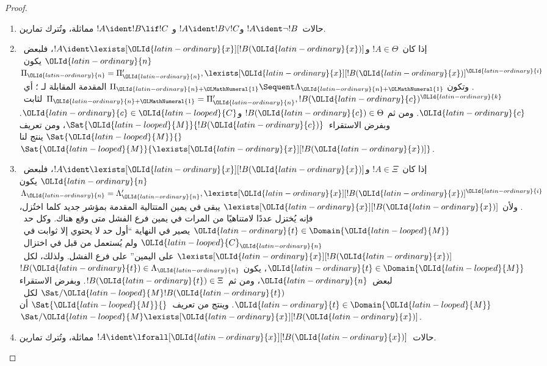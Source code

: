 \documentclass[../../../include/open-logic-section]{subfiles}
\begin{document}
\begin{proof}
\begin{enumerate}
  \item حالات~$!A\ident\lnot !B$ و$!A\ident !B\lor !C$ و
  $!A\ident !B\lif !C$ مماثلة، وتُترك تمارين.

  \item إذا كان~$!A\in\Theta$ و$!A\ident\lexists[{\OLId{latin-ordinary}{x}}][!B({\OLId{latin-ordinary}{x}})]$، فلبعض~${\OLId{latin-ordinary}{n}}$
  يكون~$\Pi_{\OLId{latin-ordinary}{n}}=\Pi_{\OLId{latin-ordinary}{n}}',\lexists[{\OLId{latin-ordinary}{x}}][!B({\OLId{latin-ordinary}{x}})]^{\OLId{latin-ordinary}{i}}$. وتكون
  $\Pi_{{\OLId{latin-ordinary}{n}}+{\OLMathNumeral{1}}}\Sequent\Lambda_{{\OLId{latin-ordinary}{n}}+{\OLMathNumeral{1}}}$ المقدمة المقابلة لـ
  \LeftR{\lexists}؛ أي~$\Pi_{{\OLId{latin-ordinary}{n}}+{\OLMathNumeral{1}}}=\Pi_{\OLId{latin-ordinary}{n}}',!B({\OLId{latin-ordinary}{c}})^{\OLId{latin-ordinary}{k}}$ لثابت~${\OLId{latin-ordinary}{c}}$. ومن ثم
  $!B({\OLId{latin-ordinary}{c}})\in\Theta$ و${\OLId{latin-ordinary}{c}}\in {\OLId{latin-looped}{C}}$. وبفرض الاستقراء~$\Sat{{\OLId{latin-looped}{M}}}{!B({\OLId{latin-ordinary}{c}})}$، ومن تعريف
  $\Sat{{\OLId{latin-looped}{M}}}{}$ ينتج لنا~$\Sat{{\OLId{latin-looped}{M}}}{\lexists[{\OLId{latin-ordinary}{x}}][!B({\OLId{latin-ordinary}{x}})]}$.

  \item إذا كان~$!A\in\Xi$ و$!A\ident\lexists[{\OLId{latin-ordinary}{x}}][!B({\OLId{latin-ordinary}{x}})]$، فلبعض~${\OLId{latin-ordinary}{n}}$ يكون
  $\Lambda_{\OLId{latin-ordinary}{n}}=\Lambda_{\OLId{latin-ordinary}{n}}',\lexists[{\OLId{latin-ordinary}{x}}][!B({\OLId{latin-ordinary}{x}})]^{\OLId{latin-ordinary}{i}}$. ولأن
  $\lexists[{\OLId{latin-ordinary}{x}}][!B({\OLId{latin-ordinary}{x}})]$ يبقى في يمين المتتالية المقدمة بمؤشر جديد كلما
  اختُزل، فإنه يُختزل عددًا لامتناهيًا من المرات في يمين فرع الفشل متى وقع
  هناك. وكل حد~${\OLId{latin-ordinary}{t}}\in\Domain{{\OLId{latin-looped}{M}}}$ يصير في النهاية ``أول حد لا يحتوي إلا
  ثوابت في~${\OLId{latin-looped}{C}}_{\OLId{latin-ordinary}{n}}$ ولم يُستعمل من قبل في اختزال~$\lexists[{\OLId{latin-ordinary}{x}}][!B({\OLId{latin-ordinary}{x}})]$ على
  اليمين'' على فرع الفشل. ولذلك، لكل~${\OLId{latin-ordinary}{t}}\in\Domain{{\OLId{latin-looped}{M}}}$، يكون
  $!B({\OLId{latin-ordinary}{t}})\in\Lambda_{\OLId{latin-ordinary}{n}}$ لبعض~${\OLId{latin-ordinary}{n}}$، ومن ثم~$!B({\OLId{latin-ordinary}{t}})\in\Xi$. وبفرض الاستقراء
  $\Sat/{{\OLId{latin-looped}{M}}}{!B({\OLId{latin-ordinary}{t}})}$ لكل~${\OLId{latin-ordinary}{t}}\in\Domain{{\OLId{latin-looped}{M}}}$. وينتج من تعريف~$\Sat{{\OLId{latin-looped}{M}}}{}$ أن
  $\Sat/{{\OLId{latin-looped}{M}}}{\lexists[{\OLId{latin-ordinary}{x}}][!B({\OLId{latin-ordinary}{x}})]}$.

  \item حالات~$!A\ident\lforall[{\OLId{latin-ordinary}{x}}][!B({\OLId{latin-ordinary}{x}})]$ مماثلة، وتُترك تمارين.
\end{enumerate}
\end{proof}
\end{document}
